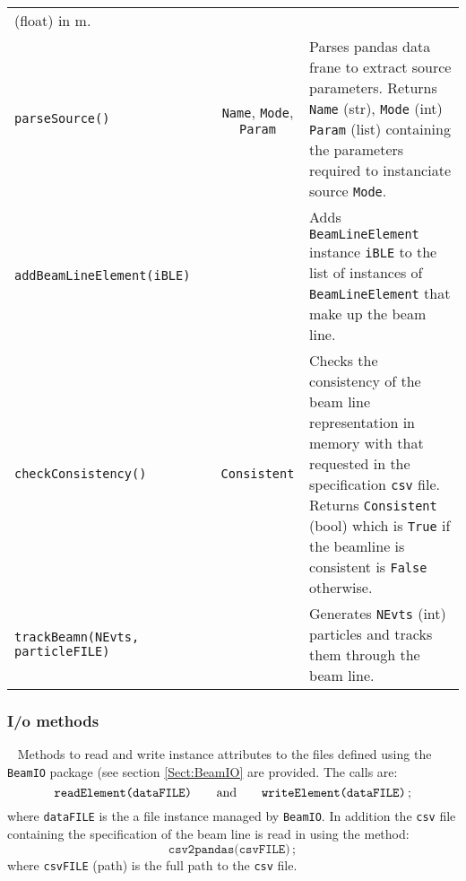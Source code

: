 \begin{table}[h]
\begin{center}
\begin{tabular}{|l|c|c|p{7cm}|}
                                                                                 (float) in m.                                 \\
      \texttt{parseSource()}   &  & \texttt{Name}, \texttt{Mode}, \texttt{Param} & Parses pandas data frane to extract
                                                                                 source parameters.
                                                                                 Returns \texttt{Name} (str), \texttt{Mode} (int)
                                                                                 \texttt{Param} (list) containing the parameters
                                                                                 required to instanciate source \texttt{Mode}. \\
      \texttt{addBeamLineElement(iBLE)} &  &  & Adds \texttt{BeamLineElement} instance \texttt{iBLE} to the list of instances of
                                                     \texttt{BeamLineElement} that make up the beam line.                      \\
      \texttt{checkConsistency()} &  & \texttt{Consistent} & Checks the consistency of the beam line representation in memory
                                                             with that requested in the specification \texttt{csv} file.
                                                             Returns \texttt{Consistent} (bool) which is \texttt{True} if the
                                                             beamline is consistent is \texttt{False} otherwise.                     \\
      \texttt{trackBeamn(NEvts, particleFILE)} &  &  & Generates \texttt{NEvts} (int) particles and tracks them through the
                                                       beam line. \\
      \hline
    \end{tabular}
  \end{center}
\end{table}

\subsubsection{I/o methods} ~\newline
\noindent
Methods to read and write instance attributes to the files defined
using the \texttt{BeamIO} package (see section \ref{Sect:BeamIO} are
provided.
The calls are:
\begin{equation}
  \texttt{readElement(dataFILE)} \quad \quad {\rm and }
      \quad \quad \texttt{writeElement(dataFILE)} \,; \nonumber
\end{equation}
where \texttt{dataFILE} is the a file instance managed by \texttt{BeamIO}.
In addition the \texttt{csv} file containing the specification of the
beam line is read in using the method:
\begin{equation}
  \texttt{csv2pandas(csvFILE)} \,; \nonumber
\end{equation}
where \texttt{csvFILE} (path) is the full path to the \texttt{csv}
file.

